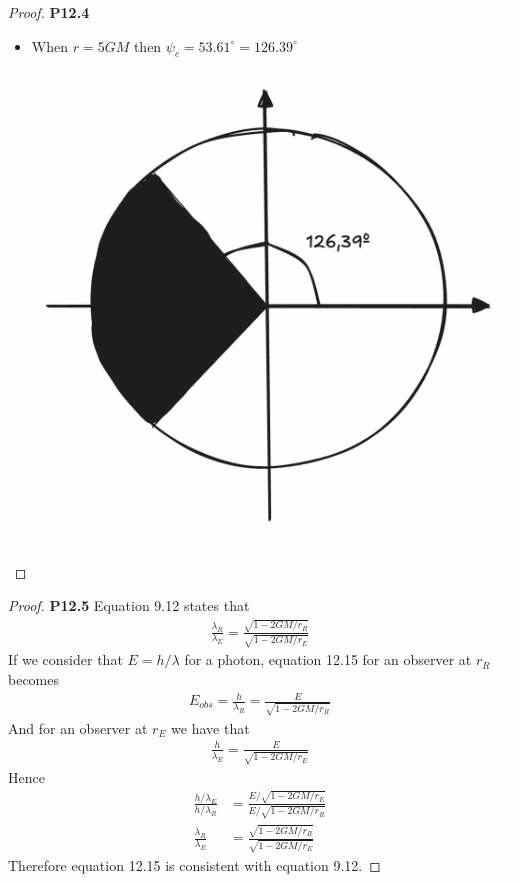 \documentclass[11pt]{article}
\theoremstyle{definition}
\begin{document}
\begin{proof}{\textbf{P12.4}}
\begin{itemize}
\begin{itemize}
\begin{center}
        \end{center}
        \item When $r = 5GM$ then $\psi_c = 53.61^\circ = 126.39^\circ$
        \begin{center}
            \includegraphics[scale=0.3]{ch12-p12.4-d.png}
        \end{center}
    \end{itemize}
\end{itemize}
\end{proof}
\cleardoublepage
\begin{proof}{\textbf{P12.5}}
    Equation 9.12 states that
    \begin{align*}
        \frac{\lambda_R}{\lambda_E}
        = \frac{\sqrt{1 - 2GM/r_R}}{\sqrt{1 - 2GM/r_E}}
    \end{align*}
    If we consider that $E = h/\lambda$ for a photon, equation 12.15 for
    an observer at $r_R$ becomes
    \begin{align*}
        E_{obs} = \frac{h}{\lambda_R} = \frac{E}{\sqrt{1 - 2GM/r_R}}
    \end{align*}
    And for an observer at $r_E$ we have that
    \begin{align*}
        \frac{h}{\lambda_E} = \frac{E}{\sqrt{1 - 2GM/r_E}}
    \end{align*}
    Hence 
    \begin{align*}
        \frac{h/\lambda_E}{h/\lambda_R}
        &= \frac{E/\sqrt{1 - 2GM/r_E}}{E/\sqrt{1 - 2GM/r_R}}\\
        \frac{\lambda_R}{\lambda_E}
        &= \frac{\sqrt{1 - 2GM/r_R}}{\sqrt{1 - 2GM/r_E}}
    \end{align*}
    Therefore equation 12.15 is consistent with equation 9.12.
\end{proof}
\end{document}
